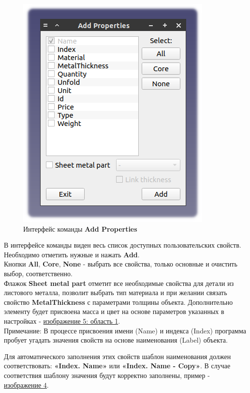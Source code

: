 \documentclass[a4paper,12pt]{article}
\begin{document}
\begin{figure}[htp]
\centering
\includegraphics[scale=0.8]{img/properties_add.png}
\caption{Интерфейс команды \textbf{Add Properties}}
\label{sec:properties_add}
\end{figure}

В интерфейсе команды виден весь список доступных пользовательских свойств. Необходимо отметить нужные и нажать \textbf{Add}.\\

Кнопки \textbf{All}, \textbf{Core}, \textbf{None} - выбрать все свойства, только основные и очистить выбор, соответственно.\\

Флажок \textbf{Sheet metal part} отметит все необходимые свойства для детали из листового металла, позволит выбрать тип материала и при желании связать свойство \textbf{MetalThickness} с параметрами толщины объекта. Дополнительно элементу будет присвоена масса и цвет на основе параметров указанных в настройках - \hyperref[sec:pref_sm]{изображение 5: область 1}.\\

Примечание: В процессе присвоения имени (Name) и индекса (Index) программа пробует угадать значения свойств на основе наименования (Label) объекта.

Для автоматического заполнения этих свойств шаблон наименования должен соответствовать: \textbf{«Index. Name»} или \textbf{«Index. Name - Copy»}. В случае соответствия шаблону значения будут корректно заполнены, пример - \hyperref[sec:properties]{изображение 4}.
\end{document}
